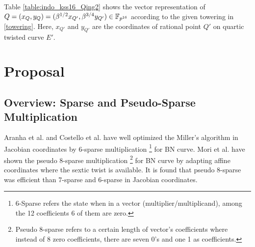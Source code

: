 Table \ref{table:indo_kss16_Qing2} shows the vector representation of $Q = (x_{Q},y_Q) = (\beta^{1/2}x_{Q'},\beta^{3/4}y_{Q'}) \in \mathbb{F}_{p^{16}}$ according to the given towering in \eqref{towering}. Here, $x_{Q'}$ and $y_{Q'}$ are the coordinates of rational point $Q'$ on quartic twisted curve $E'$. 
\renewcommand{\baselinestretch}{1.5}
\begin{table*}[ht]
\caption{Vector representation of $Q = (x_Q,y_Q) \in \g2 \subset E(\mathbb{F}_{p^{16}})$.}
\label{table:indo_kss16_Qing2}
\centering
{}
\end{table*}
\renewcommand{\baselinestretch}{1.0}
\section{Proposal}

\subsection{Overview: Sparse and Pseudo-Sparse Multiplication}
Aranha et al. \cite[Section 4]{EC:AKLGL11} and Costello et al. \cite{PKC:CosLanNae10} have  well optimized the Miller's algorithm in Jacobian coordinates by 6-sparse multiplication \footnote{\label{6sparse}{6-Sparse refers the state when in a vector (multiplier/multiplicand), among the 12 coefficients 6 of them are zero.}} for BN curve. 
Mori et al. \cite{PAIRING:MANS13} have  shown the pseudo  8-sparse multiplication \footnote{\label{pseudo8sparse}{Pseudo 8-sparse refers to a certain length of vector's coefficients where instead of 8 zero coefficients, there are seven  0's and one 1 as coefficients.}} for BN curve by adapting affine coordinates where the sextic twist is available. 
It is found that pseudo 8-sparse was efficient than 7-sparse and 6-sparse in Jacobian coordinates. 

